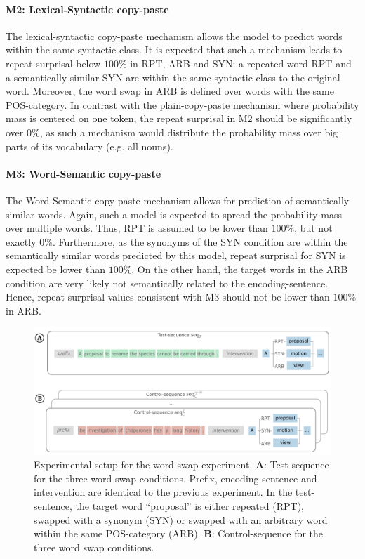\paragraph{M2: Lexical-Syntactic copy-paste}
The lexical-syntactic copy-paste mechanism allows the model to predict words within the same syntactic class.
It is expected that such a mechanism leads to repeat surprisal below $100\%$ in RPT, ARB and SYN: a repeated word RPT and a semantically similar SYN are within the same syntactic class to the original word.
Moreover, the word swap in ARB is defined over words with the same POS-category. In contrast with the plain-copy-paste mechanism where probability mass is centered on one token, the repeat surprisal in M2 should be significantly over $0\%$, as such a mechanism would distribute the probability mass over big parts of its vocabulary (e.g. all nouns).

\paragraph{M3: Word-Semantic copy-paste}
The Word-Semantic copy-paste mechanism allows for prediction of semantically similar words.
Again, such a model is expected to spread the probability mass over multiple words.
Thus, RPT is assumed to be lower than $100\%$, but not exactly $0\%$.
Furthermore, as the synonyms of the SYN condition are within the semantically similar words predicted by this model, repeat surprisal for SYN is expected be lower than $100\%$.
On the other hand, the target words in the ARB condition are very likely not semantically related to the encoding-sentence.
Hence, repeat surprisal values consistent with M3 should not be lower than $100\%$ in ARB.

\begin{figure}
    \centering
    \includegraphics[width=\textwidth]{methods/word_swap_setup.pdf}
    \caption{Experimental setup for the word-swap experiment. \textbf{A}: Test-sequence for the three word swap conditions. Prefix, encoding-sentence and intervention are identical to the previous experiment. In the test-sentence, the target word ``proposal'' is either repeated (RPT), swapped with a synonym (SYN) or swapped with an arbitrary word within the same POS-category (ARB). \textbf{B}: Control-sequence for the three word swap conditions. }
    \label{fig:word_swap_setup}
\end{figure}


